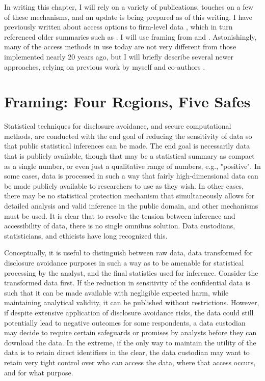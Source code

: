 In writing this chapter, I will rely on a variety of publications. \cite{fcsm_report_2005} touches on a few of these mechanisms, and an update is being prepared as of this writing. I have previously written about access options to firm-level data \cite{vilhuber_methods_2013}, which in turn referenced older summaries such as \cite{weinberg_access_2007}. I will use framing from \cite{desai_five_2016} and \cite{altman_towards_2015}. Astonishingly, many of the access methods in use today are not very different from those implemented nearly 20 years ago, but I will briefly describe several newer approaches, relying on previous work by myself and co-authors \cite{shen_physically_2021}.

\section{Framing: Four Regions, Five Safes}

Statistical techniques for disclosure avoidance, and secure computational methods, are conducted with the end goal of reducing the sensitivity of  data so that public statistical inferences can be made. The end goal is necessarily data that is publicly available, though that may be a statistical summary as compact as a single number, or even just a qualitative range of numbers, e.g., "positive". In some cases, data is processed in such a way that fairly high-dimensional data can be made publicly available to researchers to use as they wish. In other cases, there may be no statistical protection mechanism that simultaneously allows for detailed analysis and valid inference in the public domain, and other mechanisms must be used. It is clear that to resolve the tension between inference and accessibility of data, there is no single omnibus solution. Data custodians, statisticians, and ethicists have long recognized this. 

Conceptually, it is useful to distinguish between raw data, data transformed for disclosure avoidance purposes in such a way as to be amenable for statistical processing by the analyst, and the final statistics used for inference. Consider the transformed data first. If the reduction in sensitivity of the confidential data is such that it can be made available with negligible expected harm, while maintaining analytical validity, it can be published without restrictions. However, if despite extensive application of disclosure avoidance risks, the data could still potentially lead to negative outcomes for some respondents, a data custodian may decide to require certain safeguards or promises by analysts before they can download the data. In the extreme, if the only way to maintain the utility of the data is to retain direct identifiers in the clear, the data custodian may want to retain very tight control over who can access the data, where that access occurs, and for what purpose. 

